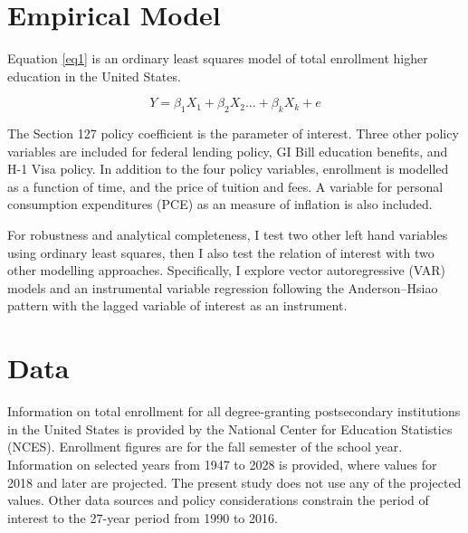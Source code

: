 \documentclass[review]{elsarticle}
\begin{document}
    \section{Empirical Model}

    Equation \ref{eq1} is an ordinary least squares model of total enrollment higher education in the United States.

    \begin{equation}
        Y = \beta_1X_1+\beta_2X_2...+\beta_kX_k+e
        \label{eq1}
    \end{equation}

    The Section 127 policy coefficient is the parameter of interest.
    Three other policy variables are included for federal lending policy, GI Bill education benefits, and H-1 Visa policy.
    In addition to the four policy variables, 
    enrollment is modelled as a function of time,
    and the price of tuition and fees.
    A variable for personal consumption expenditures (PCE) as an measure of inflation is also included.

    For robustness and analytical completeness, I test two other left hand variables using ordinary least squares,
    then I also test the relation of interest with two other modelling approaches.
    Specifically, I explore vector autoregressive (VAR) models
    and an instrumental variable regression following the Anderson–Hsiao pattern\cite{anderson1981estimation} with the lagged variable of interest as an instrument.

    \section{Data}

    Information on total enrollment for all degree-granting postsecondary institutions in the United States
    is provided by the National Center for Education Statistics (NCES)\cite{nces_2019}.
    Enrollment figures are for the fall semester of the school year.
    Information on selected years from 1947 to 2028 is provided, where values for 2018 and later are projected.
    The present study does not use any of the projected values.
    Other data sources and policy considerations constrain the period of interest to the 27-year period from 1990 to 2016.    
\end{document}
